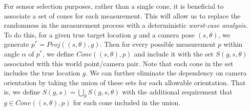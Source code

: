 %
%
%
%



For sensor selection purposes, rather than  a single cone, it is beneficial to associate a set of cones for each measurement.
This will allow us to replace the randomness in the measurement process with a deterministic {\em worst-case analysis.}
To do this, for a given true  target location $g$ and a camera pose $(s, \theta)$, we generate $p^* = Proj((s,\theta),g)$. Then for every possible measurement $p$ within  angle $\alpha$ of $p^*$, we define $Cone((s,\theta),p)$ and include it with the set $S(g, s, \theta)$ associated with this world point/camera pair. Note that each cone in the set includes the true location $g$.
We can further eliminate the dependency on camera orientation by taking the union of these sets for each allowable orientation.
That is, we define $S(g, s) = \bigcup_\theta S(g, s, \theta)$  with the additional requirement that $g \in Cone((s,\theta),p)$ for each cone included in the union.


